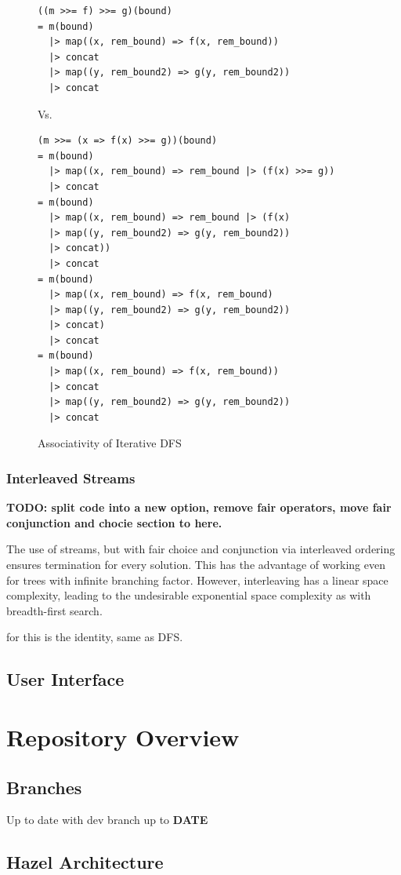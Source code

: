 \begin{figure}
\begin{verbatim}
((m >>= f) >>= g)(bound)
= m(bound) 
  |> map((x, rem_bound) => f(x, rem_bound))
  |> concat
  |> map((y, rem_bound2) => g(y, rem_bound2))
  |> concat
\end{verbatim}
Vs.
\begin{verbatim}
(m >>= (x => f(x) >>= g))(bound)
= m(bound)
  |> map((x, rem_bound) => rem_bound |> (f(x) >>= g))
  |> concat
= m(bound)
  |> map((x, rem_bound) => rem_bound |> (f(x) 
  |> map((y, rem_bound2) => g(y, rem_bound2)) 
  |> concat))
  |> concat
= m(bound)
  |> map((x, rem_bound) => f(x, rem_bound) 
  |> map((y, rem_bound2) => g(y, rem_bound2))
  |> concat)
  |> concat
= m(bound)
  |> map((x, rem_bound) => f(x, rem_bound)) 
  |> concat
  |> map((y, rem_bound2) => g(y, rem_bound2))
  |> concat
\end{verbatim}
\caption{Associativity of Iterative DFS }
\end{figure}

\subsubsection{Interleaved Streams}
\textbf{TODO: split code into a new option, remove fair operators, move fair conjunction and chocie section to here.}

The use of streams, but with fair choice and conjunction via interleaved ordering ensures termination for every solution. This has the advantage of working even for trees with infinite branching factor. However, interleaving has a linear space complexity, leading to the undesirable exponential space complexity as with breadth-first search.

 for this is the identity, same as DFS.

\subsection{User Interface}

\section{Repository Overview}
\subsection{Branches}
Up to date with dev branch up to \textbf{DATE}

\subsection{Hazel Architecture}



